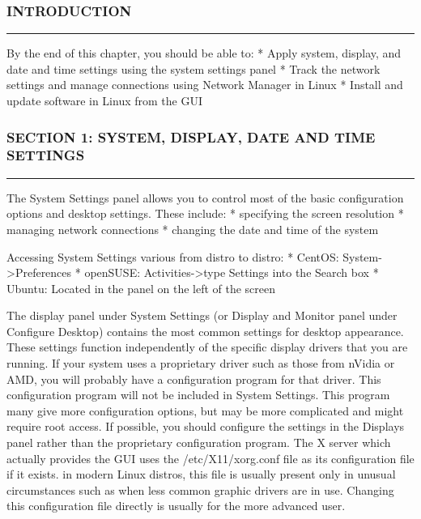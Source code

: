 \subsubsection{INTRODUCTION}\label{introduction-4}

\begin{center}\rule{3in}{0.4pt}\end{center}

By the end of this chapter, you should be able to: * Apply system,
display, and date and time settings using the system settings panel *
Track the network settings and manage connections using Network Manager
in Linux * Install and update software in Linux from the GUI

\subsubsection{SECTION 1: SYSTEM, DISPLAY, DATE AND TIME
SETTINGS}\label{section-1-system-display-date-and-time-settings}

\begin{center}\rule{3in}{0.4pt}\end{center}

The System Settings panel allows you to control most of the basic
configuration options and desktop settings. These include: * specifying
the screen resolution * managing network connections * changing the date
and time of the system

Accessing System Settings various from distro to distro: * CentOS:
System-\textgreater{}Preferences * openSUSE:
Activities-\textgreater{}type Settings into the Search box * Ubuntu:
Located in the panel on the left of the screen

The display panel under System Settings (or Display and Monitor panel
under Configure Desktop) contains the most common settings for desktop
appearance. These settings function independently of the specific
display drivers that you are running. If your system uses a proprietary
driver such as those from nVidia or AMD, you will probably have a
configuration program for that driver. This configuration program will
not be included in System Settings. This program many give more
configuration options, but may be more complicated and might require
root access. If possible, you should configure the settings in the
Displays panel rather than the proprietary configuration program. The X
server which actually provides the GUI uses the /etc/X11/xorg.conf file
as its configuration file if it exists. in modern Linux distros, this
file is usually present only in unusual circumstances such as when less
common graphic drivers are in use. Changing this configuration file
directly is usually for the more advanced user.

